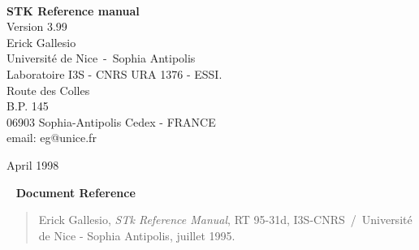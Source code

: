 \documentclass[10pt,a4paper]{book}
\begin{document}
\parindent 0pt                          %


%
% 
\renewcommand{\thechapter}{}                    %
\renewcommand{\thesection}{\arabic{section}}    %

%
%
\newcommand{\stkversion}{3.99}
\newcommand{\stk}{{\sc STk}}
\newcommand{\stklos}{{\sc STklos}}
\newcommand{\doc}{{\em Identical to R$^{4}$RS.}}
\newcommand{\rrrr}{{\em R$^{4}\!RS$}}
\newcommand{\saut}{\vskip2mm}
\newcommand{\tilda}{{\tt\char126}}
\newcommand{\etoile}{{\tt\char42}}
\newcommand{\leftbracket}{{\tt\char91}}
\newcommand{\rightbracket}{{\tt\char93}}
\newcommand{\hyperiii}[1]{\hyper{#1$_3$}}
\newcommand{\clearemptydoublepage}{\newpage{\thispagestyle{empty}\cleardoublepage}}

%
%
\thispagestyle{empty}
\begin{center}   
\ \\[3cm]
{\huge\bf ST{\large\bf{K}} Reference manual}\\[3mm]
{\Large Version \stkversion}\\[3cm]
{\large Erick Gallesio \\
Universit\'e de Nice~-~Sophia Antipolis \\
Laboratoire I3S - CNRS URA 1376 - ESSI. \\
Route des Colles\\
B.P. 145\\
06903 Sophia-Antipolis Cedex - FRANCE\\[3mm]
email: eg@unice.fr}
\end{center}
\vskip8cm
\begin{flushright}
April 1998
\end{flushright}
\newpage
\thispagestyle{empty}
{\ }
\vskip2cm
{\bf Document Reference}
\begin{quote}
Erick Gallesio, {\em STk Reference Manual}, RT 95-31d,
I3S-CNRS~/~Universit\'e de Nice - Sophia Antipolis, juillet 1995.
\end{quote}



\end{document}
